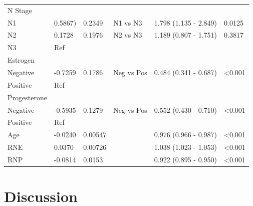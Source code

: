 \documentclass[times,sort&compress,3p]{elsarticle}
\theoremstyle{plain}
\theoremstyle{definition}
\begin{document}
\begin{table}[H]
\centering
\begin{tabular}{llllll} 
N Stage         &           &         &                &                         &                    \\
N1              & 0.5867)   & 0.2349  & N1 vs N3       & 1.798   (1.135 - 2.849) & 0.0125             \\
N2              & 0.1728    & 0.1976  & N2 vs N3       & 1.189 (0.807 - 1.751)   & 0.3817             \\
N3              & Ref       &         &                &                         &                    \\ \hline
Estrogen        &           &         &                &                         &                    \\
Negative        & -0.7259   & 0.1786  & Neg vs Pos     & 0.484 (0.341 - 0.687)   & \textless   0.001  \\
Positive        & Ref       &         &                &                         &                    \\ \hline
Progesterone    &           &         &                &                         &                    \\
Negative        & -0.5935   & 0.1279  & Neg vs Pos     & 0.552 (0.430 - 0.710)   & \textless   0.001  \\
Positive        & Ref       &         &                &                         &                    \\ \hline
Age             & -0.0240   & 0.00547 &                & 0.976 (0.966 - 0.987)   & \textless   0.001  \\ \hline
RNE             & 0.0370    & 0.00726 &                & 1.038 (1.023 - 1.053)   & \textless   0.001  \\
RNP             & -0.0814   & 0.0153  &                & 0.922 (0.895 - 0.950)   & \textless 0.001   \\ \hline \hline
\end{tabular}
\end{table}

\section{Discussion}
\end{document}
